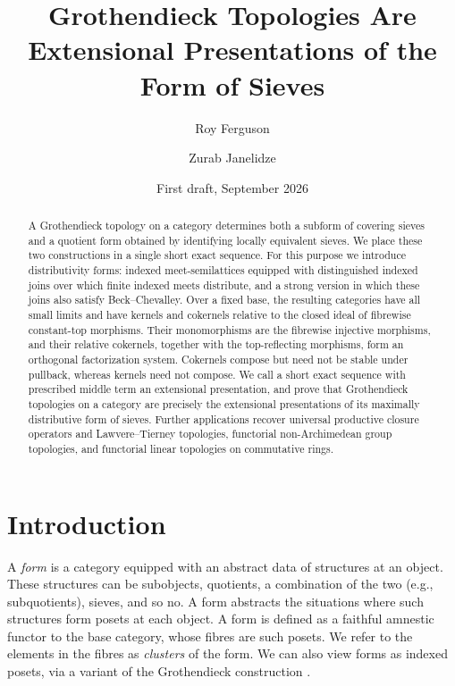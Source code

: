 \documentclass[12pt,oneside,reqno]{amsart}
\title[Grothendieck Topologies Are Extensional Presentations]
{Grothendieck Topologies Are Extensional Presentations of the Form of Sieves}
\author{Roy Ferguson}
\author{Zurab Janelidze}\thanks{\textbf{AI Assistance Disclosure}. The second author used Chat GPT-6 Astra to assist with the literature review, research, and writing and editing of this paper. The mathematical work is human-driven and AI-assisted: the authors identified the central ideas, formulated the research direction, and decided on the course of research throughout engaging with the AI, which was used solely as a time-saving aid to support research progress and improve the efficiency of writing. All AI-assisted material was critically reviewed and verified by the authors, who take full responsibility for the paper’s content, accuracy, and integrity.}
\date{First draft, September 2026}
\theoremstyle{definition}
\theoremstyle{remark}
\begin{document}
\begin{abstract}
A Grothendieck topology on a category determines both a subform of
covering sieves and a quotient form obtained by identifying locally
equivalent sieves.  We place these two constructions in a single short
exact sequence.  For this purpose we introduce distributivity forms:
indexed meet-semilattices equipped with distinguished indexed joins
over which finite indexed meets distribute, and a strong version in
which these joins also satisfy Beck--Chevalley.  Over a fixed base, the
resulting categories have all small limits and have kernels and
cokernels relative to the closed ideal of fibrewise constant-top
morphisms.  Their monomorphisms are the fibrewise injective morphisms,
and their relative cokernels, together with the top-reflecting
morphisms, form an orthogonal factorization system.  Cokernels compose
but need not be stable under pullback, whereas kernels need not compose.
We call a short exact sequence with prescribed middle term an
extensional presentation, and prove that Grothendieck topologies on a
category are precisely the extensional presentations of its maximally
distributive form of sieves.  Further applications recover universal
productive closure operators and Lawvere--Tierney topologies,
functorial non-Archimedean group topologies, and functorial linear
topologies on commutative rings.
\end{abstract}

\maketitle

\section*{Introduction}

A \emph{form} is a category equipped with an abstract data of structures at an object. These structures can be subobjects, quotients, a combination of the two (e.g., subquotients), sieves, and so no. A form abstracts the situations where such structures form posets at each object. A form is defined as a faithful amnestic functor to the base category, whose fibres are such posets. We refer to the elements in the fibres as \emph{clusters} of the form. We can also view forms as indexed posets, via a variant of the Grothendieck construction \cite[Section~B1.3]{JohnstoneElephant}.
\end{document}
